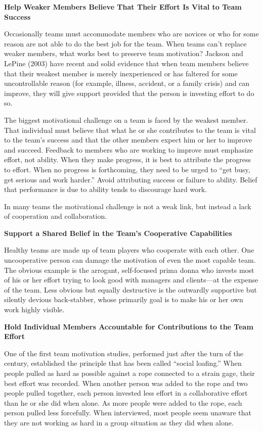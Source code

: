 \textbf{Help Weaker Members Believe That Their Effort Is Vital to Team Success}

Occasionally teams must accommodate members who are novices or who for some reason are not able to do the best job for the team. When teams can’t replace weaker members, what works best to preserve team motivation? Jackson and LePine (2003) have recent and solid evidence that when team members believe that their weakest member is merely inexperienced or has faltered for some uncontrollable reason (for example, illness, accident, or a family crisis) and can improve, they will give support provided that the person is investing effort to do so.

The biggest motivational challenge on a team is faced by the weakest member. That individual must believe that what he or she contributes to the team is vital to the team’s success and that the other members expect him or her to improve and succeed. Feedback to members who are working to improve must emphasize effort, not ability. When they make progress, it is best to attribute the progress to effort. When no progress is forthcoming, they need to be urged to ``get busy, get serious and work harder.'' Avoid attributing success or failure to ability. Belief that performance is due to ability tends to discourage hard work.

In many teams the motivational challenge is not a weak link, but instead a lack of cooperation and collaboration.

\textbf{Support a Shared Belief in the Team’s Cooperative Capabilities}

Healthy teams are made up of team players who cooperate with each other. One uncooperative person can damage the motivation of even the most capable team. The obvious example is the arrogant, self-focused prima donna who invests most of his or her effort trying to look good with managers and clients—at the expense of the team. Less obvious but equally destructive is the outwardly supportive but silently devious back-stabber, whose primarily goal is to make his or her own work highly visible.

\textbf{Hold Individual Members Accountable for Contributions to the Team Effort}

One of the first team motivation studies, performed just after the turn of the century, established the principle that has been called ``social loafing.'' When people pulled as hard as possible against a rope connected to a strain gage, their best effort was recorded. When another person was added to the rope and two people pulled together, each person invested less effort in a collaborative effort than he or she did when alone. As more people were added to the rope, each person pulled less forcefully. When interviewed, most people seem unaware that they are not working as hard in a group situation as they did when alone.

